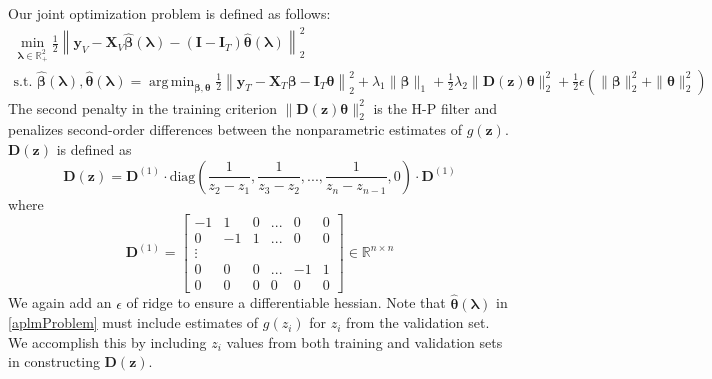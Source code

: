 \documentclass[12pt,letterpaper]{article}
\DeclareMathOperator*{\argmin}{arg\,min}
\begin{document}
Our joint optimization problem is defined as follows:
\begin{equation}
\begin{array}{c}
\min_{\boldsymbol\lambda \in \mathbb{R}^2_{+}} \frac{1}{2}
\left \|
\boldsymbol{y}_V
- \boldsymbol{X}_V\hat{\boldsymbol{\beta}}(\boldsymbol{\lambda})
- (\boldsymbol{I} - \boldsymbol{I}_T) \hat{\boldsymbol{\theta}}(\boldsymbol{\lambda})
\right \|^2_2 \\
\text{s.t. }
\hat{\boldsymbol{\beta}}(\boldsymbol{\lambda}),
\hat{\boldsymbol{\theta}}(\boldsymbol{\lambda}) =
\argmin_{\boldsymbol{\beta}, \boldsymbol{\theta}}
\frac{1}{2} \left \|
\boldsymbol{y}_T
- \boldsymbol{X}_T\boldsymbol{\beta}
- \boldsymbol{I}_T \boldsymbol{\theta} \right \|^2_2
+ \lambda_1 \| \boldsymbol{\beta} \|_1
+ \frac{1}{2} \lambda_2 \| \boldsymbol{D}(\boldsymbol{z}) \boldsymbol{\theta} \|_2^2
+ \frac{1}{2} \epsilon \left( \| \boldsymbol{\beta} \|_2^2 + \| \boldsymbol{\theta} \|_2^2 \right )
\end{array}
\label{aplmProblem}
\end{equation}
The second penalty in the training criterion $\| \boldsymbol{D}(\boldsymbol{z}) \boldsymbol{\theta} \|_2^2$ is the H-P filter and penalizes second-order differences between the nonparametric estimates of $g(\boldsymbol{z})$. $\boldsymbol{D}(\boldsymbol{z})$ is defined as
\begin{equation}
\boldsymbol{D}(\boldsymbol{z}) = \boldsymbol{D}^{(1)} \cdot
\text{diag} \left ( \frac{1}{z_{2} - z_1}, \frac{1}{z_{3} - z_2}, ... , \frac{1}{z_{n} - z_{n-1}}, 0 \right )
\cdot \boldsymbol{D}^{(1)}
\end{equation}
where
\begin{equation}
\boldsymbol{D}^{(1)} = 
\begin{bmatrix}
-1 & 1 & 0 & ... & 0 & 0 \\
0 & -1 & 1 & ... & 0 & 0 \\
\vdots \\
0 & 0 & 0 & ... & -1 & 1 \\
0 &0 & 0 &  0  &  0 & 0
\end{bmatrix}
\in
\mathbb{R}^{n\times n}
\end{equation}
We again add an $\epsilon$ of ridge to ensure a differentiable hessian. Note that $\hat{\boldsymbol{\theta}}(\boldsymbol{\lambda})$ in \eqref{aplmProblem} must include estimates of $g(z_i)$ for  $z_i$ from the validation set. We accomplish this by including $z_i$ values from both training and validation sets in constructing $\boldsymbol{D}(\boldsymbol{z})$.
\end{document}
